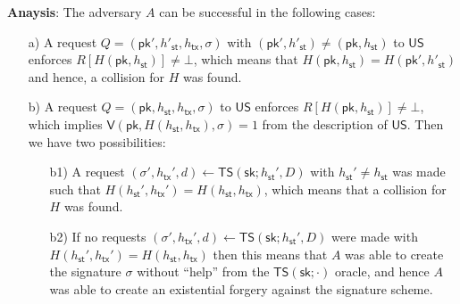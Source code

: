 \documentclass{article}
\newcommand{\pubkey}[0]{\mathsf{pk}}
\newcommand{\prikey}[0]{\mathsf{sk}}
\newcommand{\sthash}[0]{h_\mathsf{st}}
\newcommand{\txhash}[0]{h_\mathsf{tx}}
\begin{document}
\noindent\textbf{Anaysis}: The adversary $A$ can be successful in the following cases:
\begin{itemize}
\item[a)] A request $Q=(\pubkey', h'_\mathsf{st}, h_\mathsf{tx}, \sigma)$ with $(\pubkey',h'_\mathsf{st})\neq (\pubkey,h_\mathsf{st})$ to $\mathsf{US}$ enforces $R[H(\pubkey, h_\mathsf{st})]\neq\bot$, which means that  $H(\pubkey,h_\mathsf{st})=H(\pubkey', h'_\mathsf{st})$ and hence, a collision for $H$ was found.
\item[b)] A request $Q=(\pubkey, h_\mathsf{st}, h_\mathsf{tx}, \sigma)$ to $\mathsf{US}$ enforces $R[H(\pubkey, h_\mathsf{st})]\neq\bot$, which implies $\mathsf{V}(\pubkey, H(h_\mathsf{st},h_\mathsf{tx}), \sigma)=1$ from the description of $\mathsf{US}$. Then we have two possibilities:
\begin{itemize}
\item[b1)] A request $(\sigma',\txhash',d)\gets\mathsf{TS}(\prikey;\sthash',D)$ with $\sthash'\neq h_\mathsf{st}$ was made such that
$H(\sthash',\txhash')=H(\sthash,\txhash)$, which means that a collision for $H$ was found.
\item[b2)] If no requests $(\sigma',\txhash',d)\gets\mathsf{TS}(\prikey;\sthash',D)$ were made with $H(\sthash',\txhash')=H(\sthash,\txhash)$ then this means that $A$ was able to create the signature $\sigma$ without ``help'' from the $\mathsf{TS}(\prikey;\cdot)$ oracle, and hence $A$ was able to create an existential forgery against the signature scheme.
\end{itemize}
\end{itemize}
\end{document}

